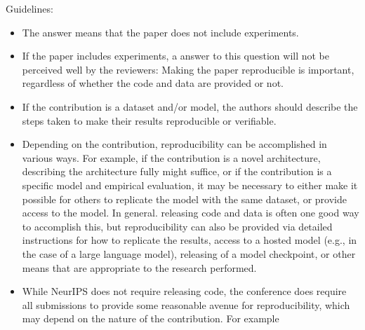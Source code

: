 \documentclass[
]{article}
\begin{document}
\begin{enumerate}
  Guidelines:

  \begin{itemize}
  \item
    The answer \answerNA{} means that the paper does not include
    experiments.
  \item
    If the paper includes experiments, a \answerNo{} answer to this
    question will not be perceived well by the reviewers: Making the
    paper reproducible is important, regardless of whether the code and
    data are provided or not.
  \item
    If the contribution is a dataset and/or model, the authors should
    describe the steps taken to make their results reproducible or
    verifiable.
  \item
    Depending on the contribution, reproducibility can be accomplished
    in various ways. For example, if the contribution is a novel
    architecture, describing the architecture fully might suffice, or if
    the contribution is a specific model and empirical evaluation, it
    may be necessary to either make it possible for others to replicate
    the model with the same dataset, or provide access to the model. In
    general. releasing code and data is often one good way to accomplish
    this, but reproducibility can also be provided via detailed
    instructions for how to replicate the results, access to a hosted
    model (e.g., in the case of a large language model), releasing of a
    model checkpoint, or other means that are appropriate to the
    research performed.
  \item
    While NeurIPS does not require releasing code, the conference does
    require all submissions to provide some reasonable avenue for
    reproducibility, which may depend on the nature of the contribution.
    For example


\end{itemize}
\end{enumerate}
\end{document}
